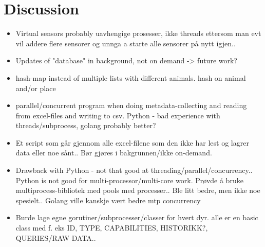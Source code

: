 \documentclass[USenglish]{uit-thesis}
\begin{document}
\chapter{Discussion}

\begin{itemize}
\item Virtual sensors probably uavhengige prosesser, ikke threads ettersom man evt vil addere flere sensorer og unnga a starte alle sensorer på nytt igjen..
\item Updates of "database" in background, not on demand -> future work?

\item hash-map instead of multiple lists with different animals. hash on animal and/or place
\item parallel/concurrent program when doing metadata-collecting and reading from excel-files and writing to csv. Python - bad experience with threads/subprocess, golang probably better?
\item Et script som går gjennom alle excel-filene som den ikke har lest og lagrer data eller noe sånt.. Bør gjøres i bakgrunnen/ikke on-demand.
\item Drawback with Python - not that good at threading/parallel/concurrency.. Python is not good for multi-processor/multi-core work. Prøvde å bruke multiprocess-bibliotek med pools med processer.. Ble litt bedre, men ikke noe spesielt.. Golang ville kanskje vært bedre mtp concurrency
\item Burde lage egne gorutiner/subprocesser/classer for hvert dyr. alle er en basic class med f. eks ID, TYPE, CAPABILITIES, HISTORIKK?, QUERIES/RAW DATA..
\end{itemize}
\end{document}
